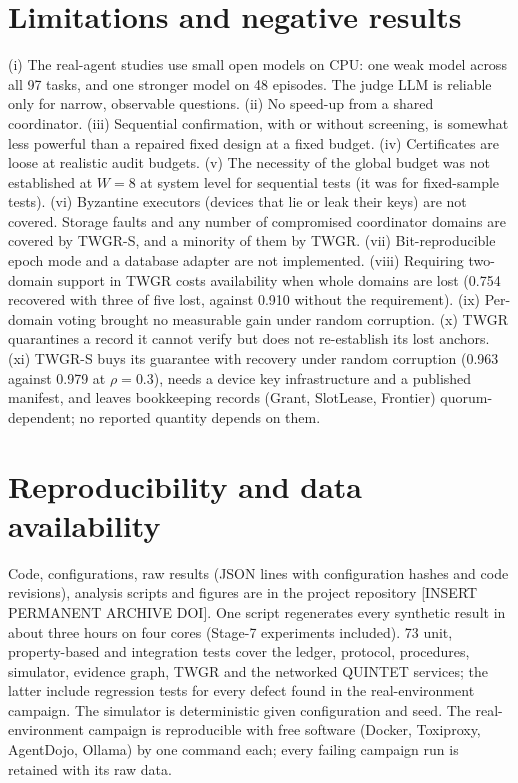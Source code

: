 \documentclass[11pt]{article}
\theoremstyle{definition}
\newcommand{\todo}[1]{\textcolor{red!70!black}{[#1]}}
\begin{document}
\section{Limitations and negative results}\label{sec:limits}
(i) The real-agent studies use small open models on CPU: one weak model across all 97 tasks, and one stronger model on 48 episodes. The judge LLM is reliable only for narrow, observable questions. (ii) No speed-up from a shared coordinator. (iii) Sequential confirmation, with or without screening, is somewhat less powerful than a repaired fixed design at a fixed budget. (iv) Certificates are loose at realistic audit budgets. (v) The necessity of the global budget was not established at $W=8$ at system level for sequential tests (it was for fixed-sample tests). (vi) Byzantine executors (devices that lie or leak their keys) are not covered. Storage faults and any number of compromised coordinator domains are covered by TWGR-S, and a minority of them by TWGR. (vii) Bit-reproducible epoch mode and a database adapter are not implemented. (viii) Requiring two-domain support in TWGR costs availability when whole domains are lost (0.754 recovered with three of five lost, against 0.910 without the requirement). (ix) Per-domain voting brought no measurable gain under random corruption. (x) TWGR quarantines a record it cannot verify but does not re-establish its lost anchors. (xi) TWGR-S buys its guarantee with recovery under random corruption (0.963 against 0.979 at $\rho=0.3$), needs a device key infrastructure and a published manifest, and leaves bookkeeping records (Grant, SlotLease, Frontier) quorum-dependent; no reported quantity depends on them.

\section{Reproducibility and data availability}\label{sec:repro}
Code, configurations, raw results (JSON lines with configuration hashes and code revisions), analysis scripts and figures are in the project repository \todo{INSERT PERMANENT ARCHIVE DOI}. One script regenerates every synthetic result in about three hours on four cores (Stage-7 experiments included). 73 unit, property-based and integration tests cover the ledger, protocol, procedures, simulator, evidence graph, TWGR and the networked QUINTET services; the latter include regression tests for every defect found in the real-environment campaign. The simulator is deterministic given configuration and seed. The real-environment campaign is reproducible with free software (Docker, Toxiproxy, AgentDojo, Ollama) by one command each; every failing campaign run is retained with its raw data.
\end{document}
